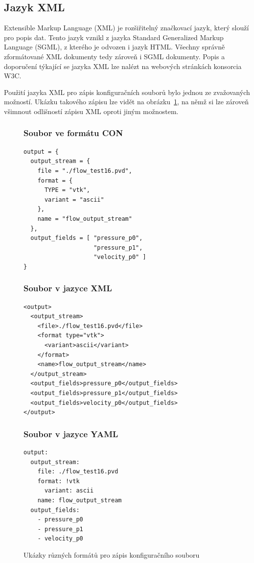 \documentclass[FM,bw,DP]{tulthesis}
\begin{document}
\subsection{Jazyk XML}

Extensible Markup Language (XML) je rozšiřitelný značkovací jazyk, který slouží pro popis dat. Tento jazyk vznikl z jazyka Standard Generalized Markup Language (SGML), z kterého je odvozen i jazyk HTML. Všechny správně zformátované XML dokumenty tedy zároveň i SGML dokumenty. Popis a doporučení týkající se jazyka XML lze nalézt na webových stránkách konsorcia W3C.

Použití jazyka XML pro zápis konfiguračních souborů bylo jednou ze zvažovaných možností. Ukázku takového zápisu lze vidět na obrázku~\ref{img:conf_files}, na němž si lze zároveň všimnout odlišností zápisu XML oproti jiným možnostem.  

\begin{figure}[H]
\singlespacing
\subsubsection*{Soubor ve formátu CON}
\begin{lstlisting}
output = {
  output_stream = {
    file = "./flow_test16.pvd", 
    format = {
      TYPE = "vtk", 
      variant = "ascii"
    }, 
    name = "flow_output_stream"
  }, 
  output_fields = [ "pressure_p0",
                    "pressure_p1", 
                    "velocity_p0" ]
}
\end{lstlisting}

\subsubsection*{Soubor v jazyce XML}
\begin{lstlisting}
<output>
  <output_stream>
  	<file>./flow_test16.pvd</file>
  	<format type="vtk">
  	  <variant>ascii</variant>
  	</format>
  	<name>flow_output_stream</name>
  </output_stream>
  <output_fields>pressure_p0</output_fields>
  <output_fields>pressure_p1</output_fields>
  <output_fields>velocity_p0</output_fields>
</output>
\end{lstlisting}

\subsubsection*{Soubor v jazyce YAML}
\begin{lstlisting}
output:
  output_stream:
  	file: ./flow_test16.pvd
  	format: !vtk
  	  variant: ascii
  	name: flow_output_stream
  output_fields:
    - pressure_p0
    - pressure_p1
    - velocity_p0
\end{lstlisting}
\onehalfspacing
\caption{Ukázky různých formátů pro zápis konfiguračního souboru}
\label{img:conf_files}
\end{figure}
\end{document}

